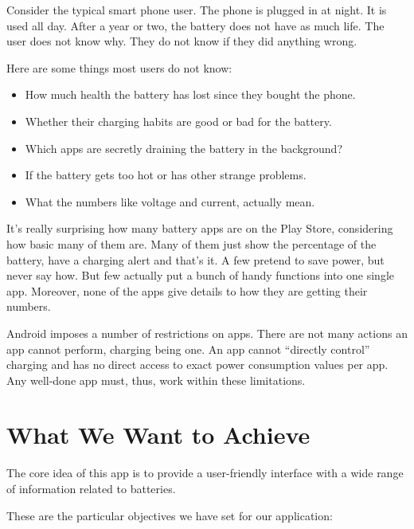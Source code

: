 \documentclass[12pt,a4paper]{report}
\begin{document}
Consider the typical smart phone user. The phone is plugged in at night. It is used all day. After a year or two, the battery does not have as much life. The user does not know why. They do not know if they did anything wrong.

Here are some things most users do not know:

\begin{itemize}
    \item How much health the battery has lost since they bought the phone.
    \item Whether their charging habits are good or bad for the battery.
    \item Which apps are secretly draining the battery in the background?
    \item If the battery gets too hot or has other strange problems.
    \item What the numbers like voltage and current, actually mean.
\end{itemize}

It's really surprising how many battery apps are on the Play Store, considering how basic many of them are. Many of them just show the percentage of the battery, have a charging alert and that's it. A few pretend to save power, but never say how. But few actually put a bunch of handy functions into one single app. Moreover, none of the apps give details to how they are getting their numbers.

Android imposes a number of restrictions on apps. There are not many actions an app cannot perform, charging being one. An app cannot ``directly control'' charging and has no direct access to exact power consumption values per app. Any well-done app must, thus, work within these limitations.

\section{What We Want to Achieve}
The core idea of this app is to provide a user-friendly interface with a wide range of information related to batteries.

These are the particular objectives we have set for our application:
\end{document}
